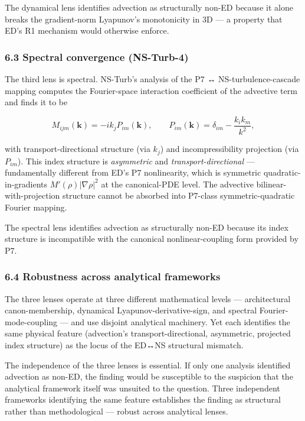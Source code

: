 \documentclass[
  11pt,a4paper]{article}
\begin{document}
The dynamical lens identifies advection as structurally non-ED because
it alone breaks the gradient-norm Lyapunov's monotonicity in 3D --- a
property that ED's R1 mechanism would otherwise enforce.

\subsubsection{6.3 Spectral convergence
(NS-Turb-4)}\label{spectral-convergence-ns-turb-4}

The third lens is spectral. NS-Turb's analysis of the P7 ↔
NS-turbulence-cascade mapping computes the Fourier-space interaction
coefficient of the advective term and finds it to be

\[M_{ijm}(\mathbf{k}) = -i k_j P_{im}(\mathbf{k}), \qquad P_{im}(\mathbf{k}) = \delta_{im} - \frac{k_i k_m}{k^2},\]

with transport-directional structure (via \(k_j\)) and incompressibility
projection (via \(P_{im}\)). This index structure is \emph{asymmetric}
and \emph{transport-directional} --- fundamentally different from ED's
P7 nonlinearity, which is symmetric quadratic-in-gradients
\(M'(\rho) |\nabla\rho|^2\) at the canonical-PDE level. The advective
bilinear-with-projection structure cannot be absorbed into P7-class
symmetric-quadratic Fourier mapping.

The spectral lens identifies advection as structurally non-ED because
its index structure is incompatible with the canonical
nonlinear-coupling form provided by P7.

\subsubsection{6.4 Robustness across analytical
frameworks}\label{robustness-across-analytical-frameworks}

The three lenses operate at three different mathematical levels ---
architectural canon-membership, dynamical Lyapunov-derivative-sign, and
spectral Fourier-mode-coupling --- and use disjoint analytical
machinery. Yet each identifies the same physical feature (advection's
transport-directional, asymmetric, projected index structure) as the
locus of the ED↔NS structural mismatch.

The independence of the three lenses is essential. If only one analysis
identified advection as non-ED, the finding would be susceptible to the
suspicion that the analytical framework itself was unsuited to the
question. Three independent frameworks identifying the same feature
establishes the finding as structural rather than methodological ---
robust across analytical lenses.
\end{document}
